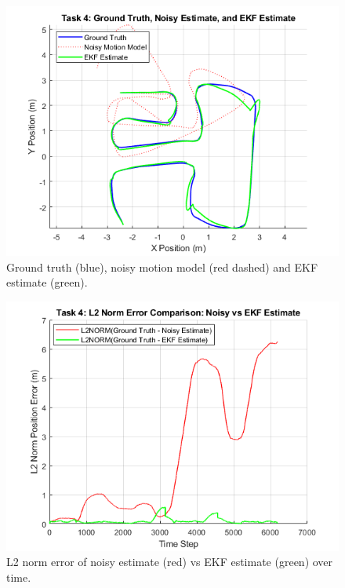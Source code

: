 \documentclass[conference]{IEEEtran}
\begin{document}
\begin{figure}[ht]
  \centering
  \includegraphics[width=\linewidth]{images/Task4_Paths.png}
  \caption{Ground truth (blue), noisy motion model (red dashed) and EKF estimate (green).}
  \label{fig:task4_paths}
\end{figure}

\begin{figure}[ht]
  \centering
  \includegraphics[width=\linewidth]{images/Task4_L2NORM.png}
  \caption{L2 norm error of noisy estimate (red) vs EKF estimate (green) over time.}
  \label{fig:task4_l2norm}
\end{figure}
\end{document}
